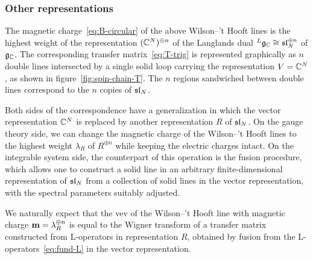 \subsubsection{Other representations}

The magnetic charge~\eqref{eq:B-circular} of the above Wilson--'t
Hooft lines is the highest weight of the representation
$(\mathbb{C}^N)^{\oplus n}$ of the Langlands dual
${}^L\mathfrak{g}_{\mathbb{C}} \cong \mathfrak{sl}_N^{\oplus n}$ of $\mathfrak{g}_{\mathbb{C}}$.  The corresponding
transfer matrix~\eqref{eq:T-trig} is represented graphically as $n$
double lines intersected by a single solid loop carrying the
representation $V = \mathbb{C}^N$, as shown in figure~\ref{fig:spin-chain-T}.
The $n$ regions sandwiched between double lines correspond to the $n$
copies of $\mathfrak{sl}_N$.

Both sides of the correspondence have a generalization in which the
vector representation $\mathbb{C}^N$ is replaced by another representation $R$
of $\mathfrak{sl}_N$.  On the gauge theory side, we can change the magnetic
charge of the Wilson--'t Hooft lines to the highest weight $\lambda_R$
of $R^{\oplus n}$ while keeping the electric charges intact.  On the
integrable system side, the counterpart of this operation is the
fusion procedure, which allows one to construct a solid line in an
arbitrary finite-dimensional representation of $\mathfrak{sl}_N$ from a
collection of solid lines in the vector representation, with the
spectral parameters suitably adjusted.

We naturally expect that the vev of the Wilson--'t Hooft line with
magnetic charge $\mathbf{m} = \lambda_R^{\oplus n}$ is equal to the
Wigner transform of a transfer matrix constructed from L-operators in
representation $R$, obtained by fusion from the
L-operators~\eqref{eq:fund-L} in the vector representation.

